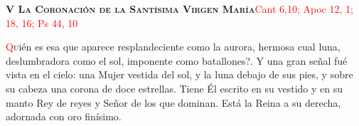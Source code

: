 \noindent\textbf{\textsc{V La Coronación de la Santísima Virgen María}}\hfill\textcolor{red}{Cant 6,10; Apoc 12, 1; 18, 16; Ps 44, 10}

\vspace{0.25em}

\lettrine[lines=2, ante={?`}]{\textcolor{red}{Q}}uién es esa que aparece resplandeciente como la aurora, hermosa cual luna, deslumbradora como el sol, imponente como batallones?.
Y una gran señal fué vista en el cielo: una Mujer vestida del sol, y la luna debajo de sus  pies, y sobre su cabeza una corona de doce estrellas.
Tiene Él escrito en su vestido y en su manto Rey de reyes y Señor de los que dominan. Está la Reina a su derecha, adornada con oro finísimo.